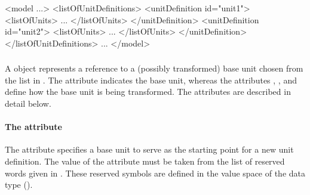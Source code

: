 \begin{example}
<model ...>
    <listOfUnitDefinitions>
        <unitDefinition id="unit1">
            <listOfUnits>
                ...
            </listOfUnits>
        </unitDefinition>
        <unitDefinition id="unit2">
            <listOfUnits>
                ...
            </listOfUnits>
        </unitDefinition>
    </listOfUnitDefinitions>
    ...
</model>
\end{example}


\subsubsection{}
\label{sec:unit-structure}

A \Unit object represents a reference to a (possibly transformed)
base unit chosen from the list in .  The
attribute  indicates the base unit, whereas the
attributes , , and 
define how the base unit is being transformed.  The attributes
are described in detail below.


\paragraph{The  attribute}

The \Unit attribute  specifies a base unit to serve as
the starting point for a new unit definition.  The value of the
attribute must be taken from the list of reserved words given in
.  These reserved symbols are defined in
the value space of the data type 
().

